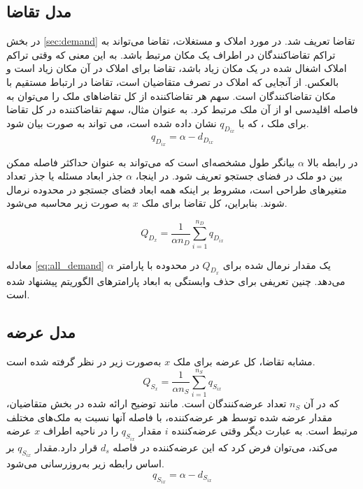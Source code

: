 \subsection{مدل تقاضا}
در بخش
\ref{sec:demand}
تقاضا تعریف شد.
در مورد املاک و مستغلات، تقاضا می‌تواند به تراکم تقاضا‌کنندگان در اطراف یک مکان مرتبط باشد. به این معنی که وقتی تراکم املاک اشغال شده در یک مکان زیاد باشد، تقاضا برای املاک در آن مکان زیاد است و بالعکس. از آنجایی که املاک در تصرف متقاضیان است، تقاضا در ارتباط مستقیم با مکان تقاضاکنندگان است. سهم هر تقاضاکننده از کل تقاضاهای ملک را می‌توان به فاصله اقلیدسی او از آن ملک مرتبط کرد. به عنوان مثال، سهم تقاضاکننده  در کل تقاضا برای ملک ، که با $q_{D_{ix}}$ نشان داده شده است، می تواند به صورت بیان شود.
\begin{equation}
	q_{D_{ix}} = \alpha - d_{D_{ix}}
\end{equation}

در رابطه بالا $\alpha$ بیانگر طول مشخصه‌ای است که می‌تواند به عنوان حداکثر فاصله ممکن بین دو ملک در فضای جستجو تعریف شود. در اینجا، $\alpha$ جذر ابعاد مسئله یا جذر تعداد متغیرهای طراحی است، مشروط بر اینکه همه ابعاد فضای جستجو در محدوده \lr{$[0, 1]$} نرمال شوند. بنابراین، کل تقاضا برای ملک $x$ به صورت زیر محاسبه می‌شود.

\begin{equation}\label{eq:all_demand}
	Q_{D_x} = \dfrac{1}{\alpha n_D} \sum_{i=1}^{n_D}q_{D_{ix}} 
\end{equation}

معادله \eqref{eq:all_demand} یک مقدار نرمال شده برای $	Q_{D_x} $ در محدوده \lr{$[0, 1]$}  با پارامتر $\alpha$ می‌دهد. چنین تعریفی برای حذف وابستگی به ابعاد پارامترهای الگوریتم پیشنهاد شده است.

\subsection{مدل عرضه}
مشابه تقاضا، کل عرضه برای ملک $x$ به‌صورت زیر در نظر گرفته شده است.
\begin{equation}\label{eq:all_supply}
	Q_{S_x} = \dfrac{1}{\alpha n_S} \sum_{i=1}^{n_S}q_{S_{ix}} 
\end{equation}
که در آن $n_S$ تعداد عرضه‌کنندگان است. مانند توضیح ارائه شده در بخش متقاضیان، مقدار عرضه شده توسط هر ‌عرضه‌کننده، با فاصله آنها نسبت به ملک‌های مختلف مرتبط است. به عبارت دیگر وقتی عرضه‌کننده
 $i$ 
مقدار
 $q_{S_{ix}}$ 
 را در ناحیه اطراف $x$ عرضه می‌کند، می‌توان فرض کرد که این ‌عرضه‌کننده در فاصله $d_s$ قرار دارد.مقدار
 $q_{S_{ix}}$ 
 بر اساس رابطه زیر به‌روزرسانی می‌شود.
\begin{equation}
	q_{S_{ix}} = \alpha - d_{S_{ix}}
\end{equation}

